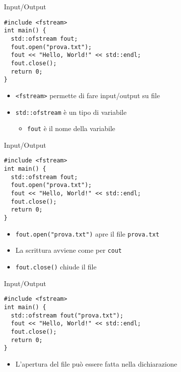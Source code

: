 \begin{frame}[fragile]{Input/Output}
  \vfill
  \begin{lstlisting}
#include <fstream>
int main() {
  std::ofstream fout;
  fout.open("prova.txt");
  fout << "Hello, World!" << std::endl;
  fout.close();
  return 0;
}
  \end{lstlisting}
  \vfill
  \begin{itemize}
    \item \lstinline$<fstream>$ permette di fare input/output su file
    \vfill
    \item \lstinline$std::ofstream$ è un tipo di variabile
    \begin{itemize}
      \item \lstinline$fout$ è il nome della variabile
    \end{itemize}
  \end{itemize}
  \vfill
\end{frame}

\begin{frame}[fragile]{Input/Output}
  \vfill
  \begin{lstlisting}
#include <fstream>
int main() {
  std::ofstream fout;
  fout.open("prova.txt");
  fout << "Hello, World!" << std::endl;
  fout.close();
  return 0;
}
  \end{lstlisting}
  \vfill
  \begin{itemize}
    \item \lstinline$fout.open("prova.txt")$ apre il file \lstinline$prova.txt$
    \vfill
    \item La scrittura avviene come per \lstinline$cout$
    \vfill
    \item \lstinline$fout.close()$ chiude il file
  \end{itemize}
  \vfill
\end{frame}

\begin{frame}[fragile]{Input/Output}
  \vfill
  \begin{lstlisting}
#include <fstream>
int main() {
  std::ofstream fout("prova.txt");
  fout << "Hello, World!" << std::endl;
  fout.close();
  return 0;
}
  \end{lstlisting}
  \vfill
  \begin{itemize}
    \item L'apertura del file può essere fatta nella dichiarazione
  \end{itemize}
  \vfill
\end{frame}

